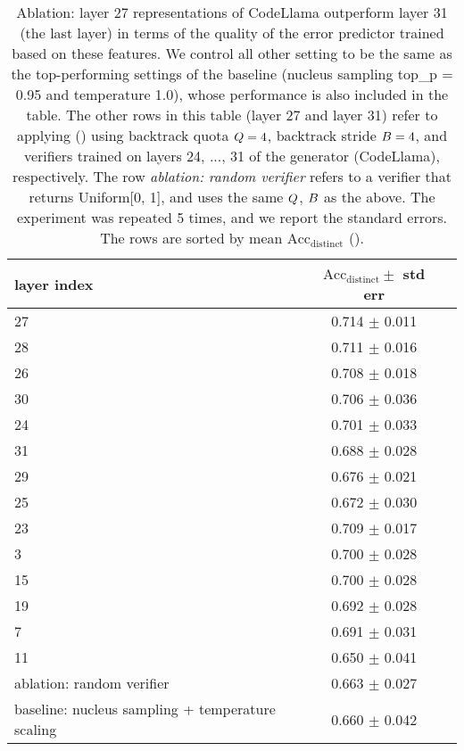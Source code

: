 \begin{table*}[t]
\begin{center}
\begin{small}
\begin{tabular}{ lcc }
\toprule
\textbf{layer index} & \textbf{$\text{Acc}_\text{distinct} \pm$ std err} \\
\hline
27 & 0.714 $\pm$ 0.011 \\
\hline
28 & 0.711 $\pm$ 0.016 \\
\hline
26 & 0.708 $\pm$ 0.018 \\
\hline
30 & 0.706 $\pm$ 0.036 \\
\hline
24 & 0.701 $\pm$ 0.033 \\
\hline
31 & 0.688 $\pm$ 0.028 \\
\hline
29 & 0.676 $\pm$ 0.021 \\
\hline
25 & 0.672 $\pm$ 0.030 \\
\hline
23 & 0.709 $\pm$ 0.017 \\
\hline
3 & 0.700 $\pm$ 0.028 \\
\hline
15 & 0.700 $\pm$ 0.028 \\
\hline
19 & 0.692 $\pm$ 0.028 \\
\hline
7 & 0.691 $\pm$ 0.031 \\
\hline
11 & 0.650 $\pm$ 0.041 \\
\hline
ablation: random verifier & 0.663 $\pm$ 0.027 \\
\hline
baseline: nucleus sampling + temperature scaling & 0.660 $\pm$ 0.042 \\
\bottomrule
\end{tabular}
\end{small}
\end{center}
\caption{
Ablation: 
layer 27 representations of CodeLlama outperform layer 31 (the last layer)
in terms of the quality of the error predictor trained based on these features.
We control all other setting to be the same as the top-performing settings of the baseline
(nucleus sampling top\_p = 0.95 \citep{holtzman2020the} and temperature 1.0),
whose performance is also included in the table.
The other rows in this table (layer 27 and layer 31)
refer to applying \algoName () 
using backtrack quota $Q = 4$,
backtrack stride $B = 4$,
and verifiers trained on layers 24, ..., 31 of the generator (CodeLlama), respectively.
The row \emph{ablation: random verifier} refers to 
a verifier that returns Uniform[0, 1], and uses the same $Q$, $B$ as the above.
The experiment was repeated 5 times,
and we report the standard errors.
The rows are sorted by mean $\text{Acc}_\text{distinct}$ ().
}
\label{table:layer27_better_than_layer31}
\end{table*}



